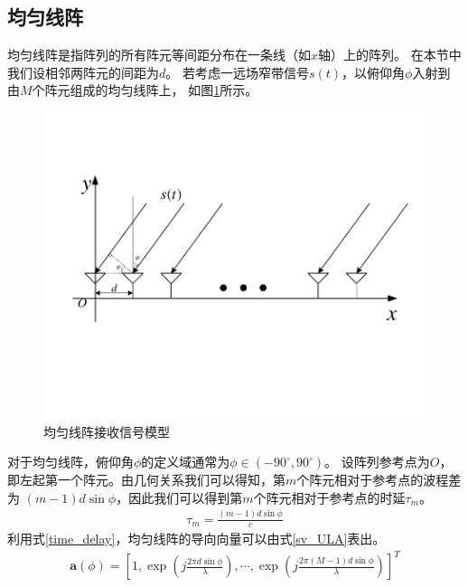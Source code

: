 \documentclass[master]{thesis-uestc}
\begin{document}
\subsection{均匀线阵}
均匀线阵是指阵列的所有阵元等间距分布在一条线（如$x$轴）上的阵列。
在本节中我们设相邻两阵元的间距为$d$。
若考虑一远场窄带信号$s(t)$，以俯仰角$\phi$入射到由$M$个阵元组成的均匀线阵上，
如图\ref{ULA}所示。
\begin{figure}[h]
\includegraphics[scale=0.8]{pic/ULA.pdf}
\caption{均匀线阵接收信号模型}
\label{ULA}
\end{figure}

对于均匀线阵，俯仰角$\phi$的定义域通常为$\phi\in\left(-90^\circ,90^\circ\right)$。
设阵列参考点为$O$，即左起第一个阵元。由几何关系我们可以得知，第$m$个阵元相对于参考点的波程差为
$(m-1)d\sin\phi$，因此我们可以得到第$m$个阵元相对于参考点的时延$\tau_m$。
\begin{equation}\label{time_delay}
    \begin{aligned}
    \tau_m = \frac{(m-1)d\sin\phi}{c}
    \end{aligned}
\end{equation}
利用式\eqref{time_delay}，均匀线阵的导向向量可以由式\eqref{sv_ULA}表出。
\begin{equation}\label{sv_ULA}
    \begin{aligned}
        \bm{a}(\phi) = 
        \left[
        1,
        \exp\left(j\frac{2\pi d\sin\phi}{\lambda}\right),
        \cdots,
        \exp\left(j\frac{2\pi(M-1)d\sin\phi}{\lambda}\right)
        \right]^T
    \end{aligned}
\end{equation}
\end{document}
